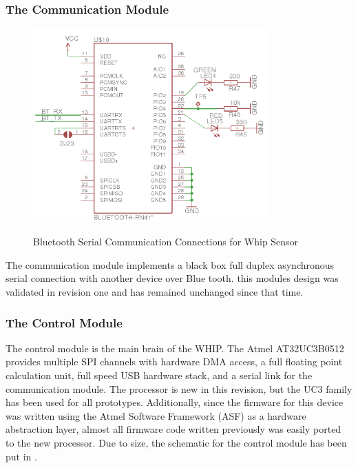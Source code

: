 \subsubsection{The Communication Module}
\begin{figure}
	\begin{center}
		\label{fig:Rev5_BT}
		\includegraphics[scale=1,width=0.8\textwidth]{Images/Rev5_BT.png} 
		\caption{Bluetooth Serial Communication Connections for Whip Sensor}
	\end{center}
\end{figure}
The communication module implements a black box full duplex asynchronous serial connection with another device over Blue tooth. this modules design was validated in revision one and has remained unchanged since that time. 

\subsubsection{The Control Module}
The control module is the main brain of the WHIP. The Atmel AT32UC3B0512 provides multiple SPI channels with hardware DMA access, a full floating point calculation unit, full speed USB hardware stack, and a serial link for the communication module.\cite{AT32UC3B} The processor is new in this revision, but the UC3 family has been used for all prototypes. Additionally, since the firmware for this device was written using the Atmel Software Framework (ASF) as a hardware abstraction layer, almost all firmware code written previously was easily ported to the new processor. Due to size, the schematic for the control module has been put in .


